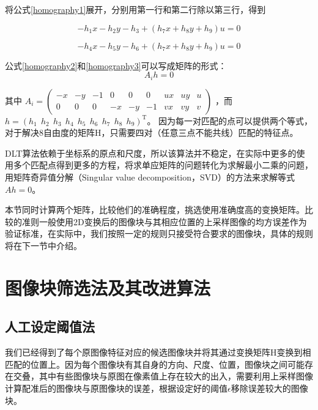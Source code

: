 将公式\eqref{homography1}展开，分别用第一行和第二行除以第三行，得到

\begin{equation}
\label{homography2}
-h_1x - h_2y - h_3 + (h_7x+h_8y+h_9)u = 0
\end{equation}

\begin{equation}
\label{homography3}
-h_4x - h_5y - h_6 + (h_7x+h_8y+h_9)u = 0
\end{equation}

公式\eqref{homography2}和\eqref{homography3}可以写成矩阵的形式：
\begin{equation}
\label{homography4}
A_ih = 0
\end{equation}

其中
\(A_i = 
\begin{pmatrix}
-x & -y & -1 & 0 & 0 & 0 &ux & uy & u \\
0 & 0 & 0 & -x & -y & -1 &vx & vy & v 
\end{pmatrix}\)
，而
\(h = (h_1 \ \ h_2 \ \ h_3 \ \ h_4 \ \ h_5 \ \ h_6 \ \ h_7 \ \ h_8 \ \ h_9)^\mathrm{T}\)。
因为每一对匹配的点可以提供两个等式，对于解决8自由度的矩阵H，只需要四对（任意三点不能共线）匹配的特征点。

DLT算法依赖于坐标系的原点和尺度，所以该算法并不稳定，在实际中更多的使用多个匹配点得到更多的方程，将求单应矩阵的问题转化为求解最小二乘的问题，用矩阵奇异值分解（Singular value decomposition，SVD）的方法来求解等式\(Ah = 0\)。

本节同时计算两个矩阵，比较他们的准确程度，挑选使用准确度高的变换矩阵。比较的准则一般使用2D变换后的图像块与其相应位置的上采样图像的均方误差作为验证标准，在实际中，我们按照一定的规则只接受符合要求的图像块，具体的规则将在下一节中介绍。

\section{图像块筛选法及其改进算法}
\subsection{人工设定阈值法}
我们已经得到了每个原图像特征对应的候选图像块并将其通过变换矩阵H变换到相匹配的位置上。因为每个图像块有其自身的方向、尺度、位置，图像块之间可能存在交叠，其中有些图像块与原图在像素值上存在较大的出入，需要利用上采样图像计算配准后的图像块与原图像块的误差，根据设定好的阈值\(\epsilon\)移除误差较大的图像块。

